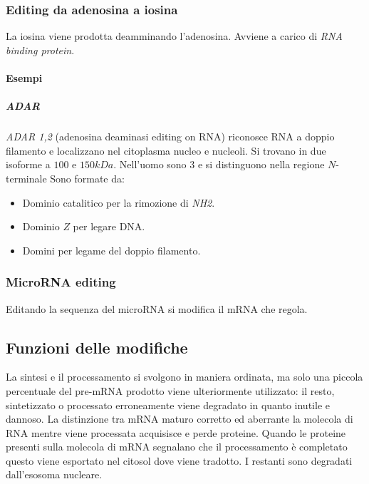 		\subsubsection{Editing da adenosina a iosina}
		La iosina viene prodotta deamminando l'adenosina.
		Avviene a carico di \emph{RNA binding protein}.

			\paragraph{Esempi}

				\subparagraph{ADAR}
				\emph{ADAR 1,2} (adenosina deaminasi editing on RNA) riconosce RNA a doppio filamento e localizzano nel citoplasma nucleo e nucleoli.
				Si trovano in due isoforme a $100$ e $150kDa$.
				Nell'uomo sono $3$ e si distinguono nella regione $N$-terminale
				Sono formate da:
				\begin{multicols}{2}
					\begin{itemize}
						\item Dominio catalitico per la rimozione di \emph{NH2}.
						\item Dominio $Z$ per legare DNA.
						\item Domini per legame del doppio filamento.
					\end{itemize}
				\end{multicols}

		\subsubsection{MicroRNA editing}
		Editando la sequenza del microRNA si modifica il mRNA che regola.


	\subsection{Funzioni delle modifiche}
	La sintesi e il processamento si svolgono in maniera ordinata, ma solo una piccola percentuale del pre-mRNA prodotto viene ulteriormente utilizzato: il resto, sintetizzato o processato erroneamente viene degradato in quanto inutile e dannoso.
	La distinzione tra mRNA maturo corretto ed aberrante la molecola di RNA mentre viene processata acquisisce e perde proteine.
	Quando le proteine presenti sulla molecola di mRNA segnalano che il processamento \`e completato questo viene esportato nel citosol dove viene tradotto.
	I restanti sono degradati dall'esosoma nucleare.
